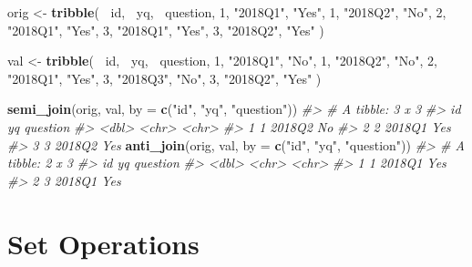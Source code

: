 \documentclass[]{book}
\newenvironment{Shaded}{\begin{snugshade}}{\end{snugshade}}
\newcommand{\CommentTok}[1]{\textcolor[rgb]{0.56,0.35,0.01}{\textit{#1}}}
\newcommand{\DataTypeTok}[1]{\textcolor[rgb]{0.13,0.29,0.53}{#1}}
\newcommand{\DecValTok}[1]{\textcolor[rgb]{0.00,0.00,0.81}{#1}}
\newcommand{\KeywordTok}[1]{\textcolor[rgb]{0.13,0.29,0.53}{\textbf{#1}}}
\newcommand{\NormalTok}[1]{#1}
\newcommand{\OperatorTok}[1]{\textcolor[rgb]{0.81,0.36,0.00}{\textbf{#1}}}
\newcommand{\StringTok}[1]{\textcolor[rgb]{0.31,0.60,0.02}{#1}}
\theoremstyle{definition}
\theoremstyle{definition}
\theoremstyle{definition}
\theoremstyle{remark}
\begin{document}
\begin{Shaded}
\begin{Highlighting}[]
\NormalTok{orig <-}\StringTok{ }\KeywordTok{tribble}\NormalTok{(}
  \OperatorTok{~}\NormalTok{id, }\OperatorTok{~}\NormalTok{yq, }\OperatorTok{~}\NormalTok{question,}
     \DecValTok{1}\NormalTok{, }\StringTok{"2018Q1"}\NormalTok{, }\StringTok{"Yes"}\NormalTok{,}
     \DecValTok{1}\NormalTok{, }\StringTok{"2018Q2"}\NormalTok{, }\StringTok{"No"}\NormalTok{,}
     \DecValTok{2}\NormalTok{, }\StringTok{"2018Q1"}\NormalTok{, }\StringTok{"Yes"}\NormalTok{,}
     \DecValTok{3}\NormalTok{, }\StringTok{"2018Q1"}\NormalTok{, }\StringTok{"Yes"}\NormalTok{,}
     \DecValTok{3}\NormalTok{, }\StringTok{"2018Q2"}\NormalTok{, }\StringTok{"Yes"}
\NormalTok{)}

\NormalTok{val <-}\StringTok{ }\KeywordTok{tribble}\NormalTok{(}
  \OperatorTok{~}\NormalTok{id, }\OperatorTok{~}\NormalTok{yq, }\OperatorTok{~}\NormalTok{question,}
     \DecValTok{1}\NormalTok{, }\StringTok{"2018Q1"}\NormalTok{, }\StringTok{"No"}\NormalTok{,}
     \DecValTok{1}\NormalTok{, }\StringTok{"2018Q2"}\NormalTok{, }\StringTok{"No"}\NormalTok{,}
     \DecValTok{2}\NormalTok{, }\StringTok{"2018Q1"}\NormalTok{, }\StringTok{"Yes"}\NormalTok{,}
     \DecValTok{3}\NormalTok{, }\StringTok{"2018Q3"}\NormalTok{, }\StringTok{"No"}\NormalTok{,}
     \DecValTok{3}\NormalTok{, }\StringTok{"2018Q2"}\NormalTok{, }\StringTok{"Yes"}
\NormalTok{)}

\KeywordTok{semi_join}\NormalTok{(orig, val, }\DataTypeTok{by =} \KeywordTok{c}\NormalTok{(}\StringTok{"id"}\NormalTok{, }\StringTok{"yq"}\NormalTok{, }\StringTok{"question"}\NormalTok{))}
\CommentTok{#> # A tibble: 3 x 3}
\CommentTok{#>      id yq     question}
\CommentTok{#>   <dbl> <chr>  <chr>   }
\CommentTok{#> 1     1 2018Q2 No      }
\CommentTok{#> 2     2 2018Q1 Yes     }
\CommentTok{#> 3     3 2018Q2 Yes}
\KeywordTok{anti_join}\NormalTok{(orig, val, }\DataTypeTok{by =} \KeywordTok{c}\NormalTok{(}\StringTok{"id"}\NormalTok{, }\StringTok{"yq"}\NormalTok{, }\StringTok{"question"}\NormalTok{))}
\CommentTok{#> # A tibble: 2 x 3}
\CommentTok{#>      id yq     question}
\CommentTok{#>   <dbl> <chr>  <chr>   }
\CommentTok{#> 1     1 2018Q1 Yes     }
\CommentTok{#> 2     3 2018Q1 Yes}
\end{Highlighting}
\end{Shaded}

\hypertarget{set-operations}{%
\section{Set Operations}\label{set-operations}}
\end{document}

